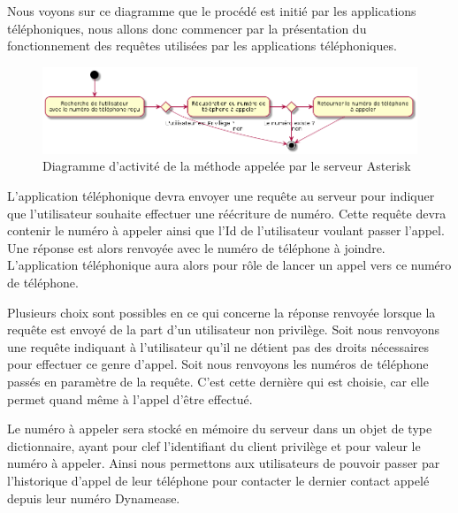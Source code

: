 Nous voyons sur ce diagramme que le procédé est initié par les applications téléphoniques, nous allons donc commencer par la présentation du fonctionnement des requêtes utilisées par les applications téléphoniques.
\newpage

\begin{figure}[!h]
	\centering
	\includegraphics[scale=0.5]{img/activity_rewrite_ast.png}
	\caption{\label{activity_rewrite_ast} Diagramme d'activité de la méthode appelée par le serveur Asterisk}
\end{figure}


L'application téléphonique devra envoyer une requête au serveur pour indiquer que l'utilisateur souhaite effectuer une réécriture de numéro. Cette requête devra contenir le numéro à appeler ainsi que l'Id de l'utilisateur voulant passer l'appel. Une réponse est alors renvoyée avec le numéro de téléphone à joindre. L'application téléphonique aura alors pour rôle de lancer un appel vers ce numéro de téléphone.

Plusieurs choix sont possibles en ce qui concerne la réponse renvoyée lorsque la requête est envoyé de la part d'un utilisateur non privilège. Soit nous renvoyons une requête indiquant à l'utilisateur qu'il ne détient pas des droits nécessaires pour effectuer ce genre d'appel. Soit nous renvoyons les numéros de téléphone passés en paramètre de la requête. C'est cette dernière qui est choisie, car elle permet quand même à l'appel d'être effectué.

Le numéro à appeler sera stocké en mémoire du serveur dans un objet de type dictionnaire, ayant pour clef l'identifiant du client privilège et pour valeur le numéro à appeler. Ainsi nous permettons aux utilisateurs de pouvoir passer par l'historique d'appel de leur téléphone pour contacter le dernier contact appelé depuis leur numéro Dynamease.\\

